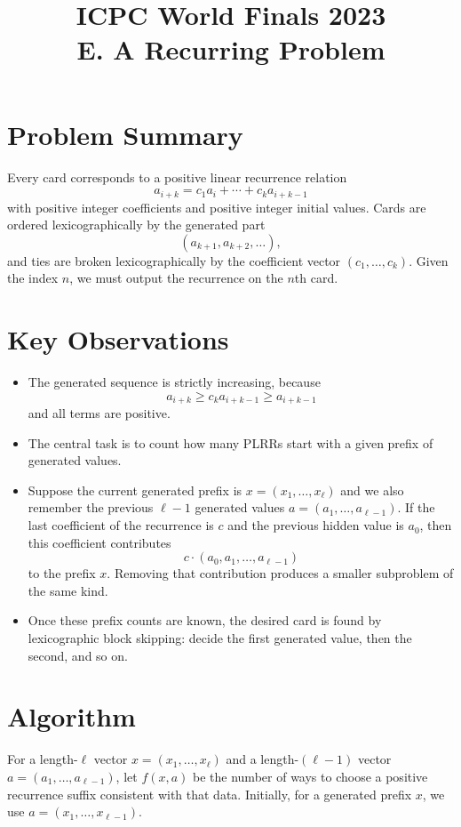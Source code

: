 \documentclass[11pt]{article}
\title{ICPC World Finals 2023\\E. A Recurring Problem}
\author{}
\date{}
\begin{document}
\maketitle

\section*{Problem Summary}

Every card corresponds to a positive linear recurrence relation
\[
a_{i+k}=c_1a_i+\cdots+c_ka_{i+k-1}
\]
with positive integer coefficients and positive integer initial values. Cards are ordered
lexicographically by the generated part
\[
(a_{k+1},a_{k+2},\dots),
\]
and ties are broken lexicographically by the coefficient vector $(c_1,\dots,c_k)$. Given the index $n$,
we must output the recurrence on the $n$th card.

\section*{Key Observations}

\begin{itemize}[leftmargin=*]
    \item The generated sequence is strictly increasing, because
    \[
    a_{i+k}\ge c_ka_{i+k-1}\ge a_{i+k-1}
    \]
    and all terms are positive.
    \item The central task is to count how many PLRRs start with a given prefix of generated values.
    \item Suppose the current generated prefix is $x=(x_1,\dots,x_\ell)$ and we also remember the previous
    $\ell-1$ generated values $a=(a_1,\dots,a_{\ell-1})$. If the last coefficient of the recurrence is $c$
    and the previous hidden value is $a_0$, then this coefficient contributes
    \[
    c\cdot(a_0,a_1,\dots,a_{\ell-1})
    \]
    to the prefix $x$. Removing that contribution produces a smaller subproblem of the same kind.
    \item Once these prefix counts are known, the desired card is found by lexicographic block skipping:
    decide the first generated value, then the second, and so on.
\end{itemize}

\section*{Algorithm}

For a length-$\ell$ vector $x=(x_1,\dots,x_\ell)$ and a length-$(\ell-1)$ vector
$a=(a_1,\dots,a_{\ell-1})$, let $f(x,a)$ be the number of ways to choose a positive recurrence suffix
consistent with that data. Initially, for a generated prefix $x$, we use $a=(x_1,\dots,x_{\ell-1})$.
\end{document}
